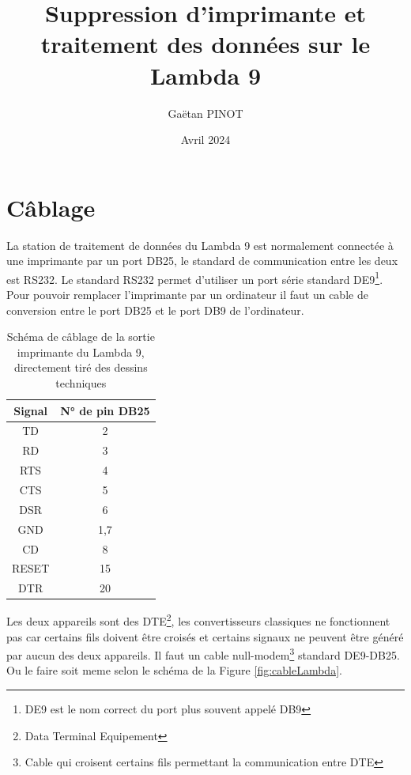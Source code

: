 \documentclass[a4paper, 12pt]{article}
\title{\Large\textbf{Suppression d'imprimante et traitement des données sur le Lambda 9}}
\author{Gaëtan PINOT}
\date{Avril 2024}
\begin{document}
\maketitle

\newpage


\section{Câblage}\label{cablage}


La station de traitement de données du Lambda 9 est normalement connectée à une imprimante par un port DB25, le standard de communication entre les deux est RS232.
Le standard RS232 permet d'utiliser un port série standard DE9\footnote{DE9 est le nom correct du port plus souvent appelé DB9 %
}.
Pour pouvoir remplacer l'imprimante par un ordinateur il faut un cable de conversion entre le port DB25 et le port DB9 de l'ordinateur.


\begin{table}[htb]
	\begin{tabular}{|c|c|}
		\hline
		Signal & N° de pin DB25 \\ \hline
		TD     & 2              \\ \hline
		RD     & 3              \\ \hline
		RTS    & 4              \\ \hline
		CTS    & 5              \\ \hline
		DSR    & 6              \\ \hline
		GND    & 1,7            \\ \hline
		CD     & 8              \\ \hline
		RESET  & 15             \\ \hline
		DTR    & 20             \\ \hline
	\end{tabular}
	\centering
	\caption{Schéma de câblage de la sortie imprimante du Lambda 9, directement tiré des dessins techniques}
	\label{table:pinoutLambda}
\end{table}

Les deux appareils sont des DTE\footnote{Data Terminal Equipement}, les convertisseurs classiques ne fonctionnent pas car certains fils doivent être croisés et certains signaux ne peuvent être généré par aucun des deux appareils.
Il faut un cable null-modem\footnote{Cable qui croisent certains fils permettant la communication entre DTE} standard DE9-DB25.
Ou le faire soit meme selon le schéma de la Figure \ref{fig:cableLambda}.
\end{document}
